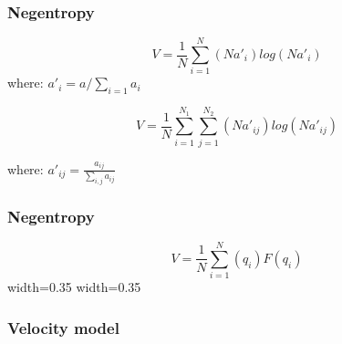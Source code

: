 \begin{frame} \frametitle{Negentropy}
\begin{equation}
        V= \frac{1}{N} \sum_{i=1}^{N} (Na'_i)log(Na'_i)
\end{equation}
where: $ a'_i= a/ \sum_{i=1} a_i $

\begin{equation}
        V= \frac{1}{N} \sum_{i=1}^{N_1} \sum_{j=1}^{N_2} (Na'_{ij})log(Na'_{ij})
\end{equation}
\begin{tabbing}
 where: $ a'_{ij}= \frac{a_{ij}}{ \sum_{i,j} a_{ij}}$
\end{tabbing}


\end{frame}


\begin{frame} \frametitle{Negentropy}
\begin{equation}
        V= \frac{1}{N} \sum_{i=1}^{N} (q_i)F(q_i)
\end{equation}
   {width=0.35\textwidth} {}
   {width=0.35\textwidth} {}


\end{frame}
\begin{frame} \frametitle{Velocity model}
	 {}
\end{frame}	

\begin{frame}
      {}
\end{frame}

\begin{frame}
      {}
\end{frame}

\begin{frame}
      {}
\end{frame}

\begin{frame}
      {}
\end{frame}

